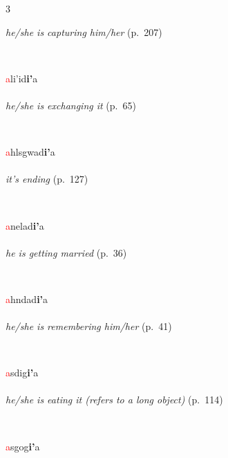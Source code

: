 \documentclass[oneside,openany]{book}%
\begin{document}
\begin{multicols}{3}
\begin{minipage}[t]{\linewidth}
\noindent \textit{he/she is capturing him/her} (p.~207)
\end{minipage}\\[1em]%
\begin{minipage}[t]{\linewidth}
\raggedright\noindent \textcolor{Red}{a}li'id\textbf{i'}a\\
\\
\noindent \textit{he/she is exchanging it} (p.~65)
\end{minipage}\\[1em]%
\begin{minipage}[t]{\linewidth}
\raggedright\noindent \textcolor{Red}{a}hlsgwad\textbf{i'}a\\
\\
\noindent \textit{it's ending} (p.~127)
\end{minipage}\\[1em]%
\begin{minipage}[t]{\linewidth}
\raggedright\noindent \textcolor{Red}{a}nelad\textbf{i'}a\\
\\
\noindent \textit{he is getting married} (p.~36)
\end{minipage}\\[1em]%
\begin{minipage}[t]{\linewidth}
\raggedright\noindent \textcolor{Red}{a}hndad\textbf{i'}a\\
\\
\noindent \textit{he/she is remembering him/her} (p.~41)
\end{minipage}\\[1em]%
\begin{minipage}[t]{\linewidth}
\raggedright\noindent \textcolor{Red}{a}sdig\textbf{i'}a\\
\\
\noindent \textit{he/she is eating it (refers to a long object)} (p.~114)
\end{minipage}\\[1em]%
\begin{minipage}[t]{\linewidth}
\raggedright\noindent \textcolor{Red}{a}sgog\textbf{i'}a\\

\end{minipage}
\end{multicols}
\end{document}
